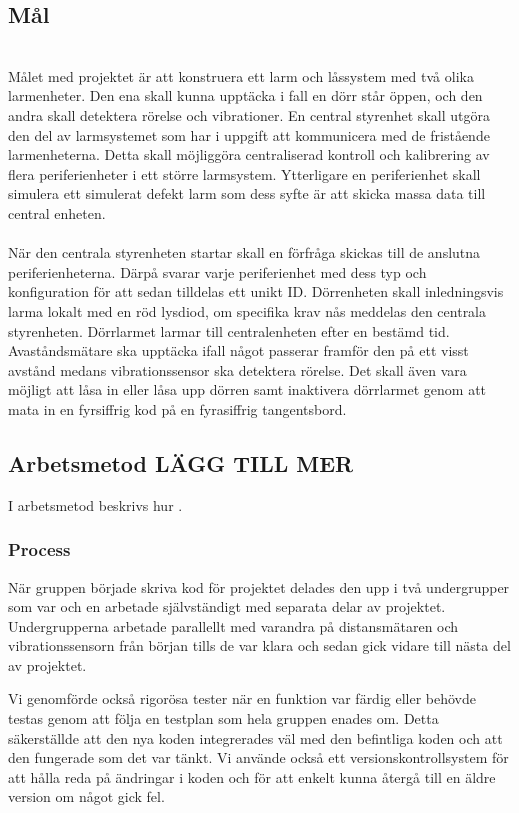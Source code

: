 \documentclass{article}
\begin{document}
\subsection{Mål}
\\
Målet med projektet är att konstruera ett larm och låssystem med två olika larmenheter. Den ena skall kunna upptäcka i fall en dörr står öppen, och den andra skall detektera rörelse och vibrationer. 
En central styrenhet skall utgöra den del av larmsystemet som har i uppgift att kommunicera med de fristående larmenheterna.
Detta skall möjliggöra centraliserad kontroll och kalibrering av flera periferienheter i ett större larmsystem.
Ytterligare en periferienhet skall simulera ett simulerat defekt larm som dess syfte är att skicka massa data till central enheten.
\\
\\
När den centrala styrenheten startar skall en förfråga skickas till de anslutna periferienheterna. Därpå svarar varje periferienhet med dess typ och konfiguration för att sedan tilldelas ett unikt ID. Dörrenheten skall inledningsvis larma lokalt med en röd lysdiod, om specifika krav nås meddelas den centrala styrenheten. Dörrlarmet larmar till centralenheten efter en bestämd tid. Avaståndsmätare ska upptäcka ifall något passerar framför den på ett visst avstånd medans vibrationssensor ska detektera rörelse. Det skall även vara möjligt att låsa in eller låsa upp dörren samt inaktivera dörrlarmet genom att mata in en fyrsiffrig kod på en fyrasiffrig tangentsbord.


\subsection{Arbetsmetod LÄGG TILL MER }
I arbetsmetod beskrivs hur .



\subsubsection{Process}
När gruppen började skriva kod för projektet delades den upp i två undergrupper som var och en arbetade självständigt med separata delar av projektet. 
Undergrupperna arbetade parallellt med varandra på distansmätaren och vibrationssensorn från början tills de var klara och sedan gick vidare till nästa del av projektet.

Vi genomförde också rigorösa tester när en funktion var färdig eller behövde testas genom att följa en testplan som hela gruppen enades om. 
Detta säkerställde att den nya koden integrerades väl med den befintliga koden och att den fungerade som det var tänkt.
Vi använde också ett versionskontrollsystem för att hålla reda på ändringar i koden och för att enkelt kunna återgå till en äldre version om något gick fel.
\end{document}
